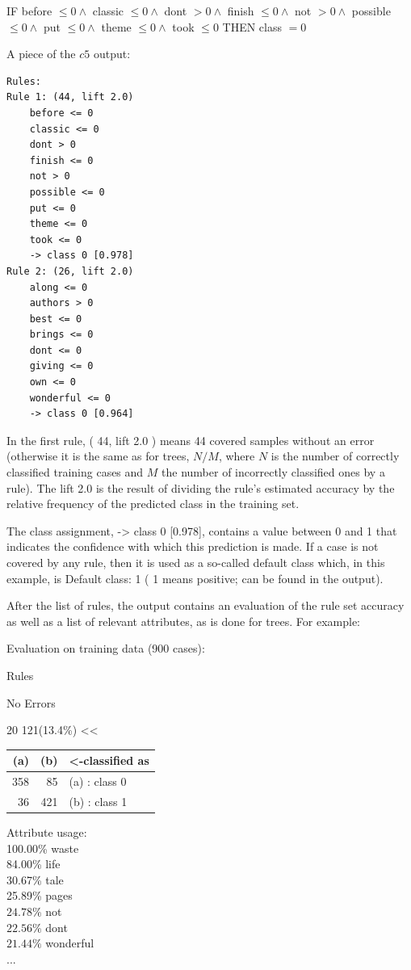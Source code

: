 IF before $\leq 0 \wedge$ classic $\leq 0 \wedge$ dont $>0 \wedge$ finish $\leq 0 \wedge$ not $>0 \wedge$ possible $\leq 0 \wedge$ put $\leq 0 \wedge$ theme $\leq 0 \wedge$ took $\leq 0$ THEN class $=0$

A piece of the $c 5$ output:

\begin{verbatim}
Rules:
Rule 1: (44, lift 2.0)
    before <= 0
    classic <= 0
    dont > 0
    finish <= 0
    not > 0
    possible <= 0
    put <= 0
    theme <= 0
    took <= 0
    -> class 0 [0.978]
Rule 2: (26, lift 2.0)
    along <= 0
    authors > 0
    best <= 0
    brings <= 0
    dont <= 0
    giving <= 0
    own <= 0
    wonderful <= 0
    -> class 0 [0.964]
\end{verbatim}

In the first rule, ( 44, lift 2.0 ) means 44 covered samples without an error (otherwise it is the same as for trees, $N / M$, where $N$ is the number of correctly classified training cases and $M$ the number of incorrectly classified ones by a rule). The lift 2.0 is the result of dividing the rule's estimated accuracy by the relative frequency of the predicted class in the training set.

The class assignment, -> class 0 [0.978], contains a value between 0 and 1 that indicates the confidence with which this prediction is made. If a case is not covered by any rule, then it is used as a so-called default class which, in this example, is Default class: 1 ( 1 means positive; can be found in the output).

After the list of rules, the output contains an evaluation of the rule set accuracy as well as a list of relevant attributes, as is done for trees. For example:

Evaluation on training data (900 cases):

Rules

No Errors

20 121(13.4\%) <<

\begin{flushleft}
\begin{tabular}{rrl}
(a) & (b) & <-classified as \\
\hline
358 & 85 & (a) : class 0 \\
36 & 421 & (b) : class 1 \\
\end{tabular}
\end{flushleft}

Attribute usage:\\
100.00\% waste\\
84.00\% life\\
30.67\% tale\\
25.89\% pages\\
$24.78 \%$ not\\
$22.56 \%$ dont\\
$21.44 \%$ wonderful\\
...

